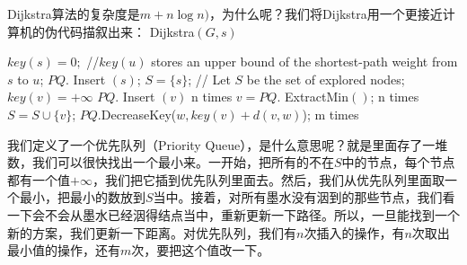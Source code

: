 	 Dijkstra算法的复杂度是$m+n\log n)$，为什么呢？我们将Dijkstra用一个更接近计算机的伪代码描叙出来：
	 {\sc Dijkstra}$( G, s )$
	 \begin{algorithmic}[1]
	 	\STATE $key(s) = 0;$  //$key(u)$ stores an upper bound of the shortest-path weight from $s$ to $u$;
	 	\STATE $PQ.$ {\sc Insert} $(s)$;
	 	\STATE $S=\{ s \}$; // Let $S$ be the set of explored nodes;
	 	\STATE $key(v) = +\infty $
	 	\STATE $PQ.$ {\sc Insert} $(v)$ { \color{red}n times}
	 	\ENDFOR
	 	\STATE $v=PQ.$ {\sc ExtractMin}$()$;{ \color{red}n times}
	 	\STATE $S=S \cup \{v\}$;
	 	\STATE $PQ.${\sc DecreaseKey}($w, key(v) + d(v, w)$); { \color{red}m times}
	 	\ENDIF
	 	\ENDFOR
	 	\ENDWHILE
	 \end{algorithmic}
	 我们定义了一个优先队列（Priority Queue），是什么意思呢？就是里面存了一堆数，我们可以很快找出一个最小来。一开始，把所有的不在$S$中的节点，每个节点都有一个值$+\infty$，我们把它插到优先队列里面去。然后，我们从优先队列里面取一个最小，把最小的数放到$S$当中。接着，对所有墨水没有洇到的那些节点，我们看一下会不会从墨水已经洇得结点当中，重新更新一下路径。所以，一旦能找到一个新的方案，我们更新一下距离。对优先队列，我们有$n$次插入的操作，有$n$次取出最小值的操作，还有$m$次，要把这个值改一下。
	 

